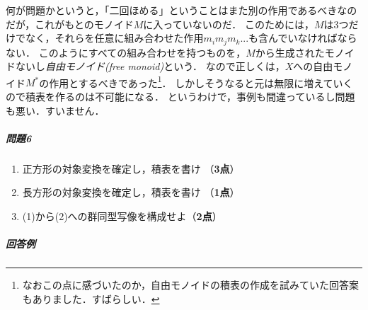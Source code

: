 \documentclass[11pt,a4paper]{jsarticle}
\begin{document}
何が問題かというと，「二回ほめる」ということはまた別の作用であるべきなのだが，これがもとのモノイド$M$に入っていないのだ．
このためには，$M$は3つだけでなく，それらを任意に組み合わせた作用$m_i m_j m_k...$も含んでいなければならない．
このようにすべての組み合わせを持つものを，$M$から生成されたモノイドないし\emph{自由モノイド(free monoid)}という．
なので正しくは，$X$への自由モノイド$M^*$の作用とするべきであった\footnote{なおこの点に感づいたのか，自由モノイドの積表の作成を試みていた回答案もありました．すばらしい．}．
しかしそうなると元は無限に増えていくので積表を作るのは不可能になる．
というわけで，事例も間違っているし問題も悪い．すいません．



\subparagraph{問題6}
\begin{enumerate}
 \item 正方形の対象変換を確定し，積表を書け （\textbf{3点}）
 \item 長方形の対象変換を確定し，積表を書け （\textbf{1点}）
 \item (1)から(2)への群同型写像を構成せよ（\textbf{2点}）
\end{enumerate}


\subparagraph{回答例}
\end{document}
